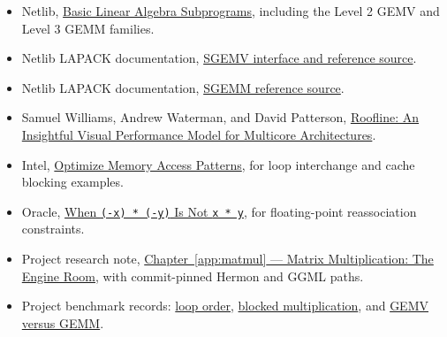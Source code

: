 \begin{itemize}
\tightlist
\item
  Netlib, \href{https://www.netlib.org/blas/}{Basic Linear Algebra
  Subprograms}, including the Level 2 GEMV and Level 3 GEMM families.
\item
Netlib LAPACK documentation,
  \href{https://netlib.org/lapack/explore-html/d7/dda/group__gemv_ga0d35d880b663ad18204bb23bd186e380.html}{SGEMV
  interface and reference source}.
\item
Netlib LAPACK documentation,
  \href{https://www.netlib.org/lapack/explore-html/d4/de2/sgemm_8f_source.html}{SGEMM
  reference source}.
\item
  Samuel Williams, Andrew Waterman, and David Patterson,
  \href{https://www2.eecs.berkeley.edu/Pubs/TechRpts/2008/EECS-2008-134.pdf}{Roofline:
  An Insightful Visual Performance Model for Multicore Architectures}.
\item
  Intel,
  \href{https://www.intel.com/content/www/us/en/docs/advisor/cookbook/2023-0/optimize-memory-access-patterns.html}{Optimize
  Memory Access Patterns}, for loop interchange and cache blocking
  examples.
\item
  Oracle,
  \href{https://docs.oracle.com/cd/E37069_01/html/E39019/gnabm.html}{When
  \texttt{(-x)\ *\ (-y)} Is Not \texttt{x\ *\ y}}, for floating-point
  reassociation constraints.
\item
  Project research note,
  \href{https://github.com/hermonai/inside-the-llm-engine/blob/astra-visual-rewrite/research/part-02/chapter-06-matrix-multiplication-the-engine-room.md}{Chapter~\ref{app:matmul} --- Matrix Multiplication: The Engine Room}, with commit-pinned
  Hermon and GGML paths.
\item
  Project benchmark records:
  \href{https://github.com/hermonai/inside-the-llm-engine/blob/astra-visual-rewrite/research/benchmarks/chapter-06-loop-order.md}{loop
  order},
  \href{https://github.com/hermonai/inside-the-llm-engine/blob/astra-visual-rewrite/research/benchmarks/chapter-06-blocked-matmul.md}{blocked
  multiplication}, and
  \href{https://github.com/hermonai/inside-the-llm-engine/blob/astra-visual-rewrite/research/benchmarks/chapter-06-gemv-vs-gemm.md}{GEMV
  versus GEMM}.
\end{itemize}



